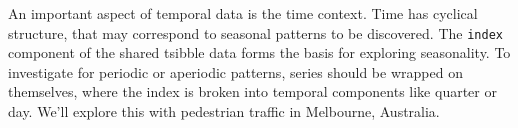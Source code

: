 An important aspect of temporal data is the time context. Time has
cyclical structure, that may correspond to seasonal patterns to be
discovered. The \texttt{index} component of the shared tsibble data
forms the basis for exploring seasonality. To investigate for periodic
or aperiodic patterns, series should be wrapped on themselves, where the
index is broken into temporal components like quarter or day. We'll
explore this with pedestrian traffic in Melbourne, Australia.

\begin{Schunk}
\begin{figure}

{\centering {}\newline{}\newline{}

}
\end{figure}
\end{Schunk}
